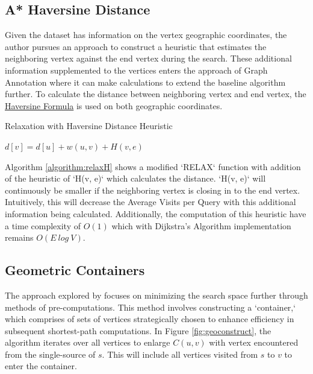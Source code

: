 \documentclass{article}
\begin{document}
\subsection{A* Haversine Distance}

Given the dataset has information on the vertex geographic coordinates,
the author pursues an approach to construct a heuristic that estimates the
neighboring vertex against the end vertex during the search. These additional information supplemented to the vertices enters the approach of Graph Annotation where it can make calculations to extend the baseline algorithm further. To calculate
the distance between neighboring vertex and end vertex, the
\href{https://en.wikipedia.org/wiki/Haversine_formula}{Haversine Formula} is used on both geographic coordinates.

\begin{algorithm}
\caption{Relaxation with Haversine Distance Heuristic}\label{alg:cap}
\begin{algorithmic}
    \State $d[v] = d[u] + w(u, v) + H(v, e)$ 
   \EndIf
\EndFunction
\end{algorithmic}
\label{algorithm:relaxH}
\end{algorithm}

Algorithm \ref{algorithm:relaxH} shows a modified `RELAX` function with 
addition of the heuristic of `H(v, e)` which calculates the distance. `H(v, 
e)` will continuously be smaller if the neighboring vertex is closing in to 
the end vertex. Intuitively, this will decrease the Average Visits per Query
with this additional information being calculated. Additionally, the 
computation of this heuristic have a time complexity of \(O(1)\) which with Dijkstra's Algorithm implementation remains $O(E \ log \ V)$.

\subsection{Geometric Containers}

The approach explored by \cite{Wagner2005} focuses on minimizing the search 
space further through methods of pre-computations. This method involves constructing a 
`container,` which comprises of sets of vertices strategically chosen to 
enhance efficiency in subsequent shortest-path computations. In Figure \ref{fig:geoconstruct}, the algorithm iterates over all vertices to enlarge $C(u, v)$ with vertex encountered from the single-source of $s$. This will include all vertices visited from $s$ to $v$ to enter the container.
\end{document}
